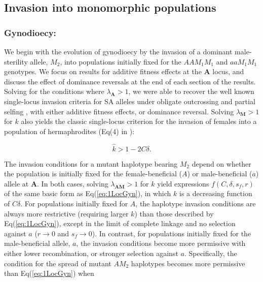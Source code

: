\documentclass[9pt,twocolumn,twoside,lineno]{gsajnl}
\begin{document}
\subsection{Invasion into monomorphic populations}

\subsubsection{Gynodioecy:} We begin with the evolution of gynodioecy by the invasion of a dominant male-sterility allele, $M_2$, into populations initially fixed for the $AAM_1M_1$ and $aaM_1M_1$ genotypes. We focus on results for additive fitness effects at the $\mathbf{A}$ locus, and discuss the effect of dominance reversals at the end of each section of the results. Solving for the conditions where $\lambda_{\mathbf{A}} > 1$, we were able to recover the well known single-locus invasion criteria for SA alleles under obligate outcrossing \citep{Kidwell1977} and partial selfing \citep{JordanConnallon2014,Olito2016}, with either additive fitness effects, or dominance reversal. Solving $\lambda_{\mathbf{M}} > 1$ for $k$ also yields the classic single-locus criterion for the invasion of females into a population of hermaphrodites (Eq(4) in \citealt{Charlesworth1978a}):

\begin{equation}\label{eq:1LocGyn}
	\hat{k} > 1 - 2 C \delta.
\end{equation}

\noindent The invasion conditions for a mutant haplotype bearing $M_2$ depend on whether the population is initially fixed for the female-beneficial ($A$) or male-beneficial ($a$) allele at $\mathbf{A}$. In both cases, solving $\lambda_{\mathbf{AM}} > 1$ for $k$ yield expressions $f(C,\delta,s_f,r)$ of the same basic form as Eq(\ref{eq:1LocGyn}), in which $k$ is a decreasing function of $C \delta$. For populations initially fixed for $A$, the haplotype invasion conditions are always more restrictive (requiring larger $k$) than those described by Eq(\ref{eq:1LocGyn}), except in the limit of complete linkage and no selection against $a$ ($r \rightarrow 0$ and $s_f \rightarrow  0$). In contrast, for populations initially fixed for the male-beneficial allele, $a$, the invasion conditions become more permissive with either lower recombination, or stronger selection against $a$. Specifically, the condition for the spread of mutant $AM_2$ haplotypes becomes more permissive than Eq(\ref{eq:1LocGyn}) when 
\end{document}
